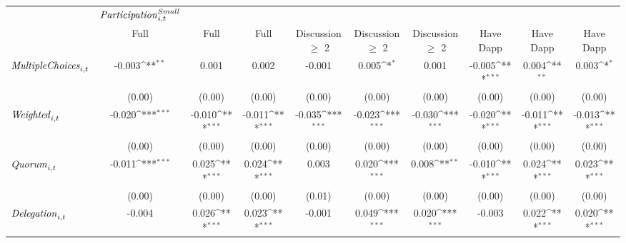 {
\def\sym#1{\ifmmode^{#1}\else\(^{#1}\)\fi}
\begin{tabular}{l*{9}{c}}
\toprule
                    &${\it Participation}^{Small}_{i,t}$         &                     &                     &                     &                     &                     &                     &                     &                     \\
                    &\multicolumn{1}{c}{Full}&\multicolumn{1}{c}{Full}&\multicolumn{1}{c}{Full}&\multicolumn{1}{c}{Discussion $\geq$ 2}&\multicolumn{1}{c}{Discussion $\geq$ 2}&\multicolumn{1}{c}{Discussion $\geq$ 2}&\multicolumn{1}{c}{Have Dapp}&\multicolumn{1}{c}{Have Dapp}&\multicolumn{1}{c}{Have Dapp}\\
\midrule
${\it Multiple Choices}_{i,t}$&      -0.003\sym{**} &       0.001         &       0.002         &      -0.001         &       0.005\sym{*}  &       0.001         &      -0.005\sym{***}&       0.004\sym{**} &       0.003\sym{*}  \\
                    &      (0.00)         &      (0.00)         &      (0.00)         &      (0.00)         &      (0.00)         &      (0.00)         &      (0.00)         &      (0.00)         &      (0.00)         \\
${\it Weighted}_{i,t}$&      -0.020\sym{***}&      -0.010\sym{***}&      -0.011\sym{***}&      -0.035\sym{***}&      -0.023\sym{***}&      -0.030\sym{***}&      -0.020\sym{***}&      -0.011\sym{***}&      -0.013\sym{***}\\
                    &      (0.00)         &      (0.00)         &      (0.00)         &      (0.00)         &      (0.00)         &      (0.00)         &      (0.00)         &      (0.00)         &      (0.00)         \\
${\it Quorum}_{i,t}$&      -0.011\sym{***}&       0.025\sym{***}&       0.024\sym{***}&       0.003         &       0.020\sym{***}&       0.008\sym{**} &      -0.010\sym{***}&       0.024\sym{***}&       0.023\sym{***}\\
                    &      (0.00)         &      (0.00)         &      (0.00)         &      (0.01)         &      (0.00)         &      (0.00)         &      (0.00)         &      (0.00)         &      (0.00)         \\
${\it Delegation}_{i,t}$&      -0.004         &       0.026\sym{***}&       0.023\sym{***}&      -0.001         &       0.049\sym{***}&       0.020\sym{***}&      -0.003         &       0.022\sym{***}&       0.020\sym{***}\\

\end{tabular}}

